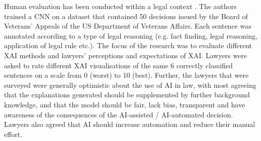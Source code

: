 \begin{table}[!ht]
	\caption{Methods of measuring human evaluation of XAI \cite{doshi-velez2017}.}
	\label{tab:human_eval_xai}
\end{table}

Human evaluation has been conducted within a legal context \cite{gorski2021}. The authors trained a CNN on a dataset that contained 50 decisions issued by the Board of Veterans' Appeals of the US Department of Veterans Affairs. Each sentence was annotated according to a type of legal reasoning (e.g. fact finding, legal reasoning, application of legal rule etc.). The focus of the research was to evaluate different XAI methods and lawyers' perceptions and expectations of XAI. Lawyers were asked to rate different XAI visualisations of the same 6 correctly classified sentences on a scale from 0 (worst) to 10 (best). Further, the lawyers that were surveyed were generally optimistic about the use of AI in law, with most agreeing that the explanations generated should be supplemented by further background knowledge, and that the model should be fair, lack bias, transparent and have awareness of the consequences of the AI-assisted / AI-automated decision. Lawyers also agreed that AI should increase automation and reduce their manual effort. 

